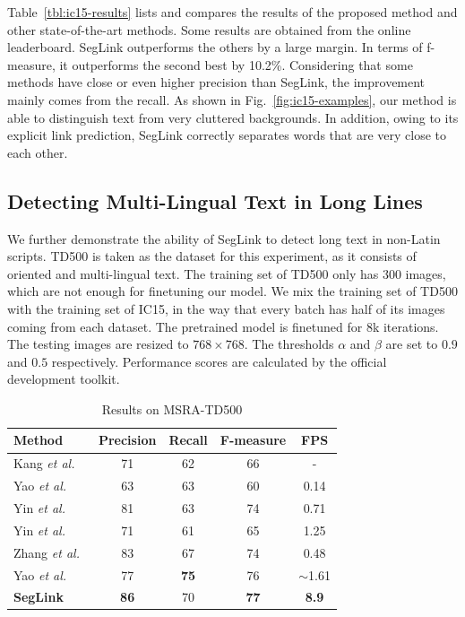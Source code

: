 \documentclass[10pt,twocolumn,letterpaper]{article}
\begin{document}
Table~\ref{tbl:ic15-results} lists and compares the results of the proposed method and other state-of-the-art methods.
Some results are obtained from the online leaderboard.
SegLink outperforms the others by a large margin.
In terms of f-measure, it outperforms the second best by 10.2\%.
Considering that some methods have close or even higher precision than SegLink, the improvement mainly comes from the recall.
As shown in Fig.~\ref{fig:ic15-examples}, our method is able to distinguish text from very cluttered backgrounds.
In addition, owing to its explicit link prediction, SegLink correctly separates words that are very close to each other.

\subsection{Detecting Multi-Lingual Text in Long Lines} \label{sec:exp-td500}
We further demonstrate the ability of SegLink to detect long text in non-Latin scripts.
TD500 is taken as the dataset for this experiment, as it consists of oriented and multi-lingual text.
The training set of TD500 only has 300 images, which are not enough for finetuning our model.
We mix the training set of TD500 with the training set of IC15, in the way that every batch has half of its images coming from each dataset.
The pretrained model is finetuned for $8$k iterations.
The testing images are resized to $768\times 768$.
The thresholds $\alpha$ and $\beta$ are set to $0.9$ and $0.5$ respectively.
Performance scores are calculated by the official development toolkit.

\begin{table}[hbt] %
  \caption{Results on MSRA-TD500}
  \vspace{0.5em}
  \centering
  \small
  \label{tbl:td500-results}
  \begin{tabular}{|l|c|c|c|c|}
  \hline
  \textbf{Method} & \textbf{Precision} & \textbf{Recall} & \textbf{F-measure} & \textbf{FPS}\tabularnewline
  \hline
  \hline
  Kang \emph{et al.}~\cite{cvpr/KangLD14} & 71 & 62 & 66 & -\tabularnewline
  \hline
  Yao \emph{et al.}~\cite{cvpr/YaoBLMT12} & 63 & 63 & 60 & 0.14\tabularnewline
  \hline
  Yin \emph{et al.}~\cite{pami/YinPZH15} & 81 & 63 & 74 & 0.71\tabularnewline
  \hline
  Yin \emph{et al.}~\cite{pami/YinYHH14} & 71 & 61 & 65 & 1.25\tabularnewline
  \hline
  Zhang \emph{et al.}~\cite{cvpr/ZhangZSYLB16} & 83 & 67 & 74 & 0.48\tabularnewline
  \hline
  Yao \emph{et al.}~\cite{corr/YaoBSZZC16} & 77 & \textbf{75} & 76 & $\sim$1.61\tabularnewline
  \hline
  \textbf{SegLink} & \textbf{86} & 70 & \textbf{77} & \textbf{8.9}\tabularnewline
  \hline
  \end{tabular}
\end{table}
\end{document}
